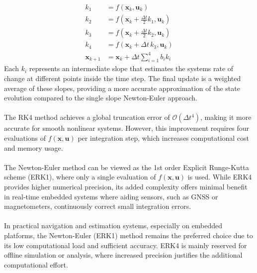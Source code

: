 $$
\begin{aligned}
    k_1 &= f(\mathbf{x}_k, \mathbf{u}_k) \\
    k_2 &= f(\mathbf{x}_k + \tfrac{\Delta t}{2}k_1, \mathbf{u}_k) \\
    k_3 &= f(\mathbf{x}_k + \tfrac{\Delta t}{2}k_2, \mathbf{u}_k) \\
    k_4 &= f(\mathbf{x}_k + \Delta t\,k_3, \mathbf{u}_k) \\
    \mathbf{x}_{k+1} &= \mathbf{x}_k + \Delta t \sum_{i=1}^{4} b_i k_i
\end{aligned}
$$
Each $k_i$ represents an intermediate slope that estimates the systems rate of change at different points inside the time step. The final update is a weighted average of these slopes, providing a more accurate approximation of the state evolution compared to the single slope Newton-Euler approach.  
\\ \\
The RK4 method achieves a global truncation error of $\mathcal{O}(\Delta t^4)$, making it more accurate for smooth nonlinear systems. However, this improvement requires four evaluations of $f(\mathbf{x}, \mathbf{u})$ per integration step, which increases computational cost and memory usage.  
\\ \\
The Newton-Euler method can be viewed as the 1st order Explicit Runge-Kutta scheme (ERK1), where only a single evaluation of $f(\mathbf{x}, \mathbf{u})$ is used. While ERK4 provides higher numerical precision, its added complexity offers minimal benefit in real-time embedded systems where aiding sensors, such as GNSS or magnetometers, continuously correct small integration errors.  
\\ \\
In practical navigation and estimation systems, especially on embedded platforms, the Newton-Euler (ERK1) method remains the preferred choice due to its low computational load and sufficient accuracy. ERK4 is mainly reserved for offline simulation or analysis, where increased precision justifies the additional computational effort.



